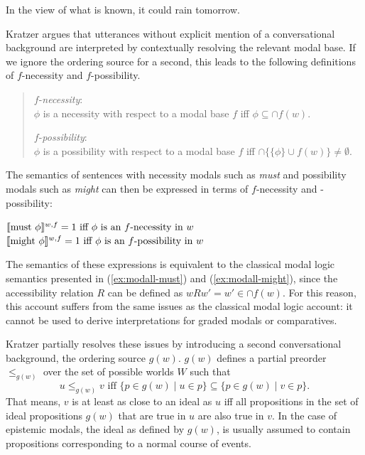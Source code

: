 \begin{exe}
\ex In the view of what is known, it could rain tomorrow.
\end{exe}

\noindent Kratzer argues that utterances without explicit mention of a conversational background are interpreted
by contextually resolving the relevant modal base. If we ignore the ordering source for a second, this leads to the following 
definitions of $f$-necessity and $f$-possibility.

\begin{quote}
\noindent $f$-\textit{necessity}: \\
$\phi$ is a necessity with respect to a modal base $f$ iff $\phi \subseteq \cap f(w)$.

\noindent $f$-\textit{possibility}: \\
$\phi$ is a possibility with respect to a modal base $f$ iff $\cap \{\{\phi\} \cup  f(w) \} \ne \emptyset$.
\end{quote}

The semantics of sentences with necessity modals such as \textit{must} and possibility modals such as \textit{might}
can then be expressed in terms of $f$-necessity and -possibility:

\begin{exe}
\ex $\llbracket\mbox{must }\phi\rrbracket^{w,f} = 1 \mbox{ iff $\phi$ is an $f$-necessity in $w$} $
\ex $\llbracket\mbox{might } \phi\rrbracket^{w,f} = 1 \mbox{ iff $\phi$ is an $f$-possibility in $w$} $
\end{exe}

The semantics of these expressions is equivalent to the classical modal logic semantics presented in (\ref{ex:modall-must})  and (\ref{ex:modall-might}), 
since the accessibility relation $R$ can be defined as $wRw' = w' \in \cap f(w)$. For this reason, this account suffers from the same
issues as the classical modal logic account: it cannot be used to derive interpretations for graded modals or comparatives.

Kratzer partially resolves these issues by introducing a second conversational background, 
the ordering source $g(w)$. $g(w)$ defines a partial preorder $\le_{g(w)}$ over the set of possible worlds $W$ such that 
$$u \le_{g(w)} v \mbox{ iff } \{ p \in g(w) \mid u \in p \} \subseteq \{ p \in g(w) \mid v \in p \}.$$
That means, $v$ is at least as close to an ideal as $u$ iff all propositions in the set of ideal 
propositions $g(w)$ that are true in $u$ are also true in $v$. In the case of epistemic modals, 
the ideal as defined by $g(w)$, is usually assumed to contain propositions corresponding to a normal course of events.

